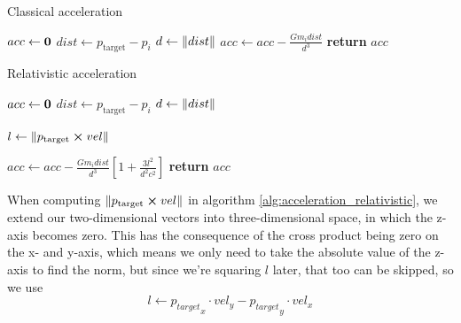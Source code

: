 \documentclass[a4paper]{article}
\begin{document}
\begin{algorithm}
\caption{Classical acceleration} \label{alg:acceleration_classical}
\begin{algorithmic}[1]
    \Statex {}
    \State $acc \gets \bf{0}$ 
            \State $dist \gets p_{\mathrm{target}} - p_{i}$
            \State $d \gets \norm{dist}$ 
            \State $acc \gets acc - \frac{G m_{i} dist}{d^3}$
        \EndIf
    \EndFor
    \State \textbf{return} $acc$
  \EndFunction
\end{algorithmic}
\end{algorithm}

\begin{algorithm}
\caption{Relativistic acceleration} \label{alg:acceleration_relativistic}
\begin{algorithmic}[1]
    \Statex {}
    \State $acc \gets \bf{0}$ 
            \State $dist \gets p_{\mathrm{target}} - p_{i}$
            \State $d \gets \norm{dist}$ 

            \State $l \gets \norm{p_{\mathrm{target}} \cross vel}$


            \State $acc \gets acc - \frac{G m_{i} dist}{d^3} \left[1 + \frac{3l^2}{d^2c^2}\right]$
        \EndIf
    \EndFor
    \State \textbf{return} $acc$
  \EndFunction
\end{algorithmic}
\end{algorithm}

When computing $\norm{p_{\mathrm{target}} \cross vel}$ in algorithm \vref{alg:acceleration_relativistic}, we extend our two-dimensional vectors into three-dimensional space, in which the z-axis becomes zero. This has the consequence of the cross product being zero on the x- and y-axis, which means we only need to take the absolute value of the z-axis to find the norm, but since we're squaring $l$ later, that too can be skipped, so we use
\begin{equation}
    l \gets {p_{target}}_{x}\cdot vel_y - {p_{target}}_{y}\cdot vel_x
\end{equation}
\end{document}
